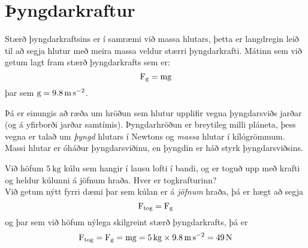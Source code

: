 \section{Þyngdarkraftur}
Stærð þyngdarkraftsins er í samræmi við massa hlutars, þetta er langdregin leið
til að segja hlutur með meira massa veldur stærri þyngdarkrafti. Mátinn sem við
getum lagt fram stærð þyngdarkrafts sem er:
\begin{equation}
	\textrm{F}_\text{\textrm{g}} = \textrm{m} \textrm{g}
\end{equation}
þar sem $\textrm{g} = \SI{9.8}{\meter\per\second\squared}$. 
\begin{center}
\end{center}
Þá er einungis að ræða um hröðun sem hlutur
upplifir vegna þyngdarsviðs jarðar (og á yfirborði jarðar samtímis).
Þyngdarhröðun er breytileg milli pláneta, þess vegna er talað um \emph{þyngd} 
hlutars í Newtons og \emph{massa} hlutar í kílógrömmum. Massi hlutar er óháður 
þyngdarsviðinu, en þyngdin er háð styrk þyngdarsviðsins.
\begin{formalexample}
Við höfum $\SI{5}{\kg}$ kúlu sem hangir í lausu lofti í bandi, og er toguð upp
með krafti og heldur kúlunni á jöfnum hraða. Hver er togkrafturinn? 
\\[4 ex]
Við getum nýtt fyrri dæmi þar sem kúlan er á \emph{jöfnum} hraða, þá er hægt að segja
\[
	\textrm{F}_\text{tog} = \textrm{F}_\text{g}
\]
og þar sem við höfum nýlega skilgreint stærð þyngdarkrafts, þá er
\[
	\uforce_\text{tog} = \uforce_\text{g} = \umass \uacceleg 
		= \SI{5}{\kg} \times \SI{9.8}{\meter\per\second\squared}
		= \SI{49}{\newton}
\]
\end{formalexample}

